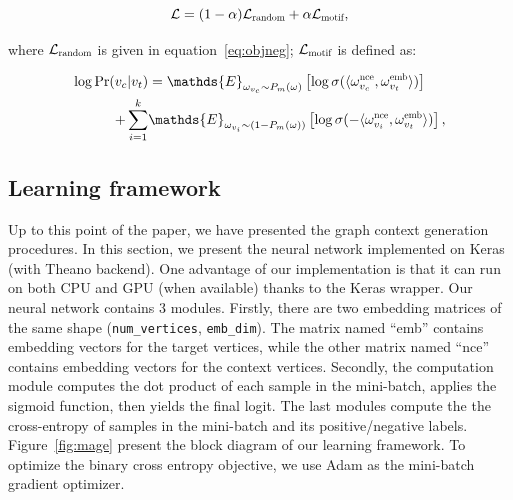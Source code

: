 \documentclass[letterpaper]{article}
\begin{document}
            \begin{equation}
                \label{eq:mageobj}
                \mathcal{L} = (1-\alpha) \mathcal{L}_{\scalebox{0.7}{random}} + 
                                \alpha \mathcal{L}_{\scalebox{0.7}{motif}} ,
            \end{equation}

            \noindent
            where $\mathcal{L}_{\scalebox{0.7}{random}}$ is given in equation~\ref{eq:objneg};
            $\mathcal{L}_{\scalebox{0.7}{motif}}$ is defined as:

            \begin{equation}
                \label{eq:objmotif}
                \begin{aligned}
                    \log \mbox{Pr} (v_c | v_t) & = \mathds{E}_{\omega_{v_c} \sim P_m(\omega)} \left[ \log \sigma( \langle \omega^{\scalebox{0.7}{nce}}_{v_c} , \omega^{\scalebox{0.7}{emb}}_{v_t} \rangle ) \right] \\
                + \sum_{i=1}^{k} & \mathds{E}_{\omega_{v_i} \sim (1-P_m(\omega))} \left[ \log \sigma( -\langle \omega^{\scalebox{0.7}{nce}}_{v_i} , \omega^{\scalebox{0.7}{emb}}_{v_t} \rangle) \right],
                \end{aligned}
            \end{equation}

        \subsection{Learning framework}
            
            Up to this point of the paper, we have presented the graph context generation procedures.
            In this section, we present the neural network implemented on Keras \cite{keras} 
            (with Theano \cite{theano} backend). One advantage of our implementation is that
            it can run on both CPU and GPU (when available) thanks to the Keras wrapper. Our
            neural network contains 3 modules. Firstly, there are two embedding matrices of 
            the same shape (\texttt{num\_vertices}, \texttt{emb\_dim}). The matrix named ``emb''
            contains embedding vectors for the target vertices, while the other matrix named
            ``nce'' contains embedding vectors for the context vertices. Secondly, the computation
            module computes the dot product of each sample in the mini-batch, applies the
            sigmoid function, then yields the final logit. The last modules compute the
            the cross-entropy \cite{xentropy} of samples in the mini-batch and its positive/negative
            labels. Figure~\ref{fig:mage} present the block diagram of our learning framework.
            To optimize the binary cross entropy objective, we use Adam \cite{adam} as the 
            mini-batch gradient optimizer.
            
\end{document}
